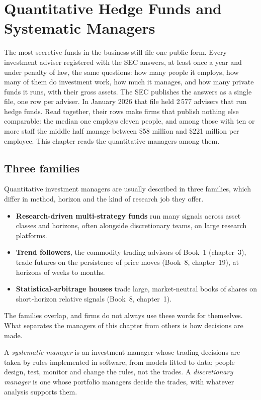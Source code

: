 \chapter{Quantitative Hedge Funds and Systematic Managers}\label{ch:in:quantitative-hedge-funds-and-systematic-managers}

The most secretive funds in the business still file one public form. Every investment adviser registered with the SEC
answers, at least once a year and under penalty of law, the same questions: how many people it employs, how many of
them do investment work, how much it manages, and how many private funds it runs, with their gross assets. The SEC
publishes the answers as a single file, one row per adviser. In January 2026 that file held 2\,577 advisers that run
hedge funds. Read together, their rows make firms that publish nothing else comparable: the median one employs eleven
people, and among those with ten or more staff the middle half manage between \$58 million and \$221 million per
employee. This chapter reads the quantitative managers among them.

\section{Three families}

Quantitative investment managers are usually described in three families, which differ in method, horizon and the
kind of research job they offer.
\begin{itemize}
\item \textbf{Research-driven multi-strategy funds} run many signals across asset classes and horizons, often
alongside discretionary teams, on large research platforms.
\item \textbf{Trend followers}, the commodity trading advisors of Book~1 (chapter~3), trade futures on the persistence
of price moves (Book~8, chapter~19), at horizons of weeks to months.
\item \textbf{Statistical-arbitrage houses} trade large, market-neutral books of shares on short-horizon relative
signals (Book~8, chapter~1).
\end{itemize}
The families overlap, and firms do not always use these words for themselves. What separates the managers of this
chapter from others is how decisions are made.

\begin{definition}\label{def:in:quantitative-hedge-funds-and-systematic-managers:sys}
A \emph{systematic manager} is an investment manager whose trading decisions are taken by rules
implemented in software, from models fitted to data; people design, test, monitor and change the rules, not the
trades. A \emph{discretionary manager} is one whose portfolio managers decide the trades,
with whatever analysis supports them.
\end{definition}

